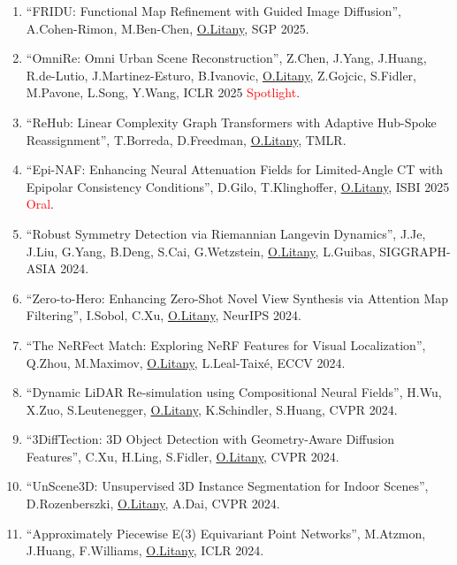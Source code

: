 \begin{enumerate}
\item ``FRIDU: Functional Map Refinement with Guided Image Diffusion'', A.Cohen-Rimon, M.Ben-Chen, \underline{O.Litany}, SGP 2025.

\item ``OmniRe: Omni Urban Scene Reconstruction'', Z.Chen, J.Yang, J.Huang, R.de-Lutio, J.Martinez-Esturo, B.Ivanovic, \underline{O.Litany}, Z.Gojcic, S.Fidler, M.Pavone, L.Song, Y.Wang, ICLR 2025 \textcolor{red}{Spotlight}.

\item ``ReHub: Linear Complexity Graph Transformers with Adaptive Hub-Spoke Reassignment'', T.Borreda, D.Freedman, \underline{O.Litany}, TMLR.

\item ``Epi-NAF: Enhancing Neural Attenuation Fields for Limited-Angle CT with Epipolar Consistency Conditions'', D.Gilo, T.Klinghoffer, \underline{O.Litany}, ISBI 2025 \textcolor{red}{Oral}.

\item ``Robust Symmetry Detection via Riemannian Langevin Dynamics'', J.Je, J.Liu, G.Yang, B.Deng, S.Cai, G.Wetzstein, \underline{O.Litany}, L.Guibas, SIGGRAPH-ASIA 2024.

\item ``Zero-to-Hero: Enhancing Zero-Shot Novel View Synthesis via Attention Map Filtering'', I.Sobol, C.Xu, \underline{O.Litany}, NeurIPS 2024.

\item ``The NeRFect Match: Exploring NeRF Features for Visual Localization'', Q.Zhou, M.Maximov, \underline{O.Litany}, L.Leal-Taixé, ECCV 2024.

\item ``Dynamic LiDAR Re-simulation using Compositional Neural Fields'', H.Wu, X.Zuo, S.Leutenegger, \underline{O.Litany}, K.Schindler, S.Huang, CVPR 2024.

\item ``3DiffTection: 3D Object Detection with Geometry-Aware Diffusion Features'', C.Xu, H.Ling, S.Fidler, \underline{O.Litany}, CVPR 2024.

\item ``UnScene3D: Unsupervised 3D Instance Segmentation for Indoor Scenes'', D.Rozenberszki, \underline{O.Litany}, A.Dai, CVPR 2024.

\item ``Approximately Piecewise E(3) Equivariant Point Networks'', M.Atzmon, J.Huang, F.Williams, \underline{O.Litany}, ICLR 2024.


\end{enumerate}
